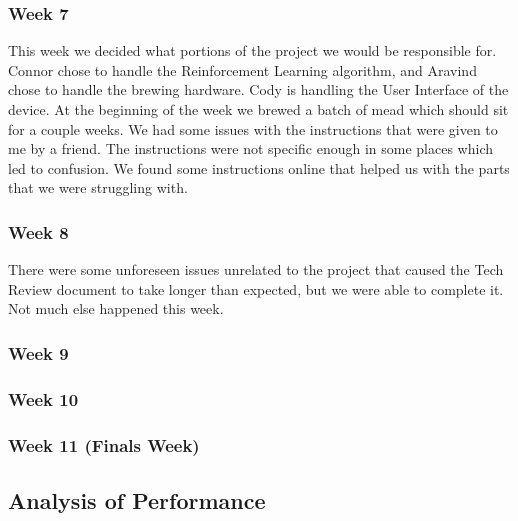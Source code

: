 \documentclass[draftclsnofoot,onecolumn,letterpaper,10pt]{IEEEtran}
\begin{document}
\subsubsection{Week 7}
This week we decided what portions of the project we would be responsible for.
Connor chose to handle the Reinforcement Learning algorithm, and Aravind chose to handle the brewing hardware.
Cody is handling the User Interface of the device.
At the beginning of the week we brewed a batch of mead which should sit for a couple weeks.
We had some issues with the instructions that were given to me by a friend.
The instructions were not specific enough in some places which led to confusion.
We found some instructions online that helped us with the parts that we were struggling with.

\subsubsection{Week 8}
There were some unforeseen issues unrelated to the project that caused the Tech Review document to take longer than expected, but we were able to complete it.
Not much else happened this week.

\subsubsection{Week 9}

\subsubsection{Week 10}

\subsubsection{Week 11 (Finals Week)}


\subsection{Analysis of Performance}\label{sec:analysis}
\end{document}
